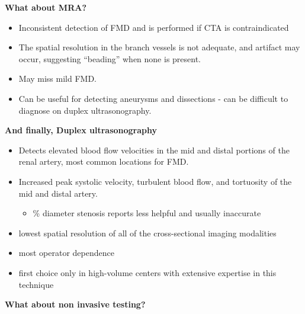 \documentclass[
]{book}
\providecommand{\tightlist}{%
  \setlength{\itemsep}{0pt}\setlength{\parskip}{0pt}}
\begin{document}
\textbf{What about MRA?}

\begin{itemize}
\item
  Inconsistent detection of FMD and is performed if CTA is
  contraindicated
\item
  The spatial resolution in the branch vessels is not adequate, and
  artifact may occur, suggesting ``beading'' when none is present.
\item
  May miss mild FMD.
\item
  Can be useful for detecting aneurysms and dissections - can be
  difficult to diagnose on duplex ultrasonography.\citep{renaud2012}
\end{itemize}

\textbf{And finally, Duplex ultrasonography}

\begin{itemize}
\item
  Detects elevated blood flow velocities in the mid and distal
  portions of the renal artery, most common locations for FMD.
\item
  Increased peak systolic velocity, turbulent blood flow, and
  tortuosity of the mid and distal artery.

  \begin{itemize}
  \tightlist
  \item
    \% diameter stenosis reports less helpful and usually inaccurate
  \end{itemize}
\item
  lowest spatial resolution of all of the cross-sectional imaging
  modalities
\item
  most operator dependence
\item
  first choice only in high-volume centers with extensive expertise in
  this technique
\end{itemize}

\textbf{What about non invasive testing?}
\end{document}
